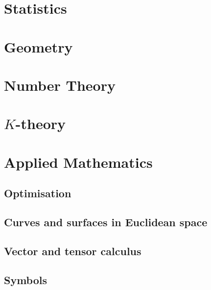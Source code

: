 \documentclass{report}
\begin{document}
\part{Statistics}
\setcounter{chapter}{0} %


\part{Geometry}
\setcounter{chapter}{0} %


\part{Number Theory}
\setcounter{chapter}{0} %


\part{$K$-theory}
\setcounter{chapter}{0} %



\part{Applied Mathematics}
\setcounter{chapter}{0} %
\chapter{Optimisation}


\chapter{Curves and surfaces in Euclidean space}

\chapter{Vector and tensor calculus}





\appendix

\chapter{Symbols}


\listoftheorems[title={List of named results}, swapnumber,ignoreall,onlynamed]

\end{document}
